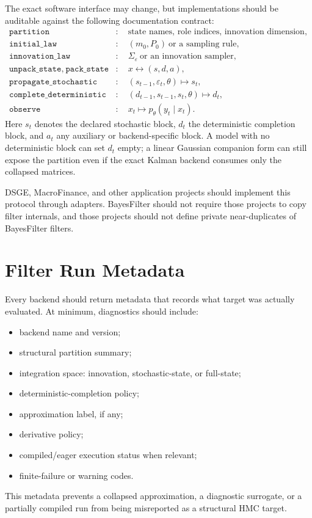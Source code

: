 The exact software interface may change, but implementations should be
auditable against the following documentation contract:
\begin{align*}
  \texttt{partition} &:\quad \text{state names, role indices, innovation dimension},\\
  \texttt{initial\_law} &:\quad (m_0,P_0)\ \text{or a sampling rule},\\
  \texttt{innovation\_law} &:\quad \Sigma_\varepsilon\ \text{or an innovation sampler},\\
  \texttt{unpack\_state},\ \texttt{pack\_state} &:\quad
    x \leftrightarrow (s,d,a),\\
  \texttt{propagate\_stochastic} &:\quad
    (s_{t-1},\varepsilon_t,\theta) \mapsto s_t,\\
  \texttt{complete\_deterministic} &:\quad
    (d_{t-1},s_{t-1},s_t,\theta) \mapsto d_t,\\
  \texttt{observe} &:\quad
    x_t \mapsto p_\theta(y_t\mid x_t).
\end{align*}
Here $s_t$ denotes the declared stochastic block, $d_t$ the deterministic
completion block, and $a_t$ any auxiliary or backend-specific block.  A model
with no deterministic block can set $d_t$ empty; a linear Gaussian companion
form can still expose the partition even if the exact Kalman backend consumes
only the collapsed matrices.

DSGE, MacroFinance, and other application projects should implement this
protocol through adapters.  BayesFilter should not require those projects to
copy filter internals, and those projects should not define private
near-duplicates of BayesFilter filters.

\section{Filter Run Metadata}
\label{sec:bf-api-filter-run-metadata}

Every backend should return metadata that records what target was actually
evaluated.  At minimum, diagnostics should include:
\begin{itemize}
  \item backend name and version;
  \item structural partition summary;
  \item integration space: innovation, stochastic-state, or full-state;
  \item deterministic-completion policy;
  \item approximation label, if any;
  \item derivative policy;
  \item compiled/eager execution status when relevant;
  \item finite-failure or warning codes.
\end{itemize}
This metadata prevents a collapsed approximation, a diagnostic surrogate, or a
partially compiled run from being misreported as a structural HMC target.

